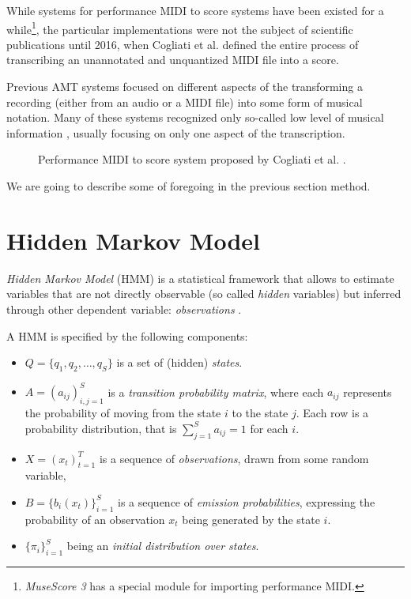 While systems for performance MIDI to score systems have been existed for a while\footnote{\emph{MuseScore 3} has a special module for importing performance MIDI. \missing}, the particular implementations were not the subject of scientific publications until 2016, when Cogliati et al. defined the entire process of transcribing an unannotated and unquantized MIDI file into a score. 

Previous AMT systems focused on different aspects of the transforming a recording (either from an audio or a MIDI file) into some form of musical notation. Many of these systems recognized only so-called low level of musical information \cite{Cogliati2016}, usually focusing on only one aspect of the transcription.

\begin{figure}[!ht]
\centering

\caption[Performance MIDI to score system proposed by Cogliati et al.]{Performance MIDI to score system proposed by Cogliati et al. \cite{Cogliati2016}.}
\end{figure}

We are going to describe some of foregoing in the previous section method.

\section{Hidden Markov Model}

\emph{Hidden Markov Model} (HMM) is a statistical framework that allows to estimate variables that are not directly observable (so called \emph{hidden} variables) but inferred through other dependent variable: \emph{observations} \cite[p. 210--213]{Jurafsky2009}.

A HMM is specified by the following components: \begin{itemize}
	\item $Q=\{q_1,q_2,\ldots, q_S\}$ is a set of (hidden) \emph{states}.
	\item $A=(a_{ij})_{i,j=1}^S$ is a \emph{transition probability matrix}, where each $a_{ij}$ represents the probability of moving from the state $i$ to the state $j$. Each row is a probability distribution, that is $\sum_{j=1}^S a_{ij}=1$ for each $i$.
	\item $X=(x_t)_{t=1}^T$ is a sequence of \emph{observations}, drawn from some random variable,
	\item $B=\{b_i(x_t)\}_{i=1}^S$ is a sequence of \emph{emission probabilities}, expressing the probability of an observation $x_t$ being generated by the state $i$.
	\item $\{\pi_i\}_{i=1}^S$ being an \emph{initial distribution over states}.
\end{itemize}

